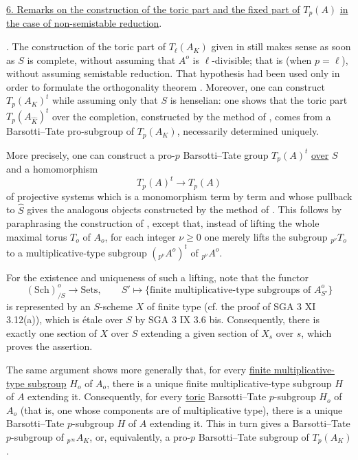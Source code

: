 
\medskip
\noindent
\underline{6. Remarks on the construction of the toric part and the fixed
part of} $T_p(A)$ \underline{in the case of non-semistable reduction}.

\medskip
\noindent
{}. The construction of the toric part of $T_\ell(A_K)$ given in 
still makes sense as soon as $S$ is complete, without assuming that
$A^o$ is $\ell$-divisible; that is (when $p=\ell$), without assuming
semistable reduction.  That hypothesis had been used only in order to
formulate the orthogonality theorem .  Moreover, one can construct
$T_p(A_K)^t$ while assuming only that $S$ is henselian: one shows that
the toric part $T_p(A_{\widehat K})^t$ over the completion, constructed
by the method of , comes from a Barsotti--Tate pro-subgroup of
$T_p(A_K)$, necessarily determined uniquely.

More precisely, one can construct a pro-$p$ Barsotti--Tate group
$T_p(A)^t$ \underline{over} $S$ and a homomorphism
\[
 T_p(A)^t\longrightarrow T_p(A)
\]
of projective systems which is a monomorphism term by term and whose
pullback to $\widehat S$ gives the analogous objects constructed by the
method of .  This follows by paraphrasing the construction of ,
except that, instead of lifting the whole maximal torus $T_o$ of $A_o$,
for each integer $\nu\geq0$ one merely lifts the subgroup
${}_{p^\nu}T_o$ to a multiplicative-type subgroup
$({}_{p^\nu}A^o)^t$ of ${}_{p^\nu}A^o$.

For the existence and uniqueness of such a lifting, note that the
functor
\[
 (\mathrm{Sch})^o_{/S}\longrightarrow\mathrm{Sets},
 \qquad
 S'\longmapsto
 \{\text{finite multiplicative-type subgroups of }A^o_{S'}\}
\]
is represented by an $S$-scheme $X$ of finite type (cf. the proof of
SGA 3 XI 3.12(a)), which is \'etale over $S$ by SGA 3 IX 3.6 bis.
Consequently, there is exactly one section of $X$ over $S$ extending a
given section of $X_s$ over $s$, which proves the assertion.

The same argument shows more generally that, for every
\underline{finite multiplicative-type subgroup} $H_o$ of $A_o$, there
is a unique finite multiplicative-type subgroup $H$ of $A$ extending
it.  Consequently, for every \underline{toric} Barsotti--Tate
$p$-subgroup $H_o$ of $A_o$ (that is, one whose components are of
multiplicative type), there is a unique Barsotti--Tate $p$-subgroup $H$
of $A$ extending it.  This in turn gives a Barsotti--Tate $p$-subgroup
of ${}_{p^\infty}A_K$, or, equivalently, a pro-$p$ Barsotti--Tate
subgroup of $T_p(A_K)$.

